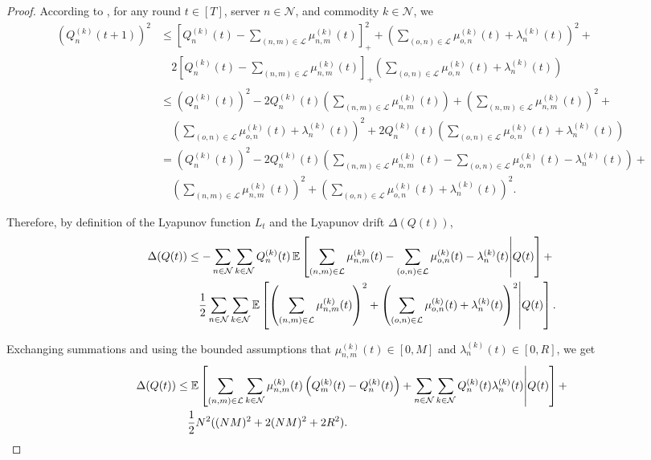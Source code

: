 \documentclass[11pt,fullpage,letterpaper]{article} %
\renewcommand{\bm}[1]{#1}%
\newcommand{\E}{\operatornamewithlimits{\mathbb{E}}}
\newcommand{\mN}{{\mathcal N}}
\newcommand{\mL}{{\mathcal L}}
\begin{document}
\begin{proof}
According to , for any round $t\in [T]$, server $n\in \mN$, and commodity $k\in \mN$, we
\begin{align*}
(Q_n^{(k)}(t+1))^2&\le \left [Q_n^{(k)}(t)-\sum_{(n,m)\in \mL}\mu_{n,m}^{(k)}(t)\right ]_+^2+\left (\sum_{(o,n)\in \mL} \mu_{o,n}^{(k)}(t) + \lambda_{n}^{(k)}(t)\right )^2+\\
&\quad 2 \left [Q_n^{(k)}(t)-\sum_{(n,m)\in \mL}\mu_{n,m}^{(k)}(t)\right ]_+\left (\sum_{(o,n)\in \mL} \mu_{o,n}^{(k)}(t) + \lambda_{n}^{(k)}(t)\right )\\
&\le (Q_n^{(k)}(t))^2 - 2 Q_n^{(k)}(t) \left (\sum_{(n,m)\in \mL}\mu_{n,m}^{(k)}(t)\right ) + \left (\sum_{(n,m)\in \mL}\mu_{n,m}^{(k)}(t)\right )^2 + \\
&\quad \left (\sum_{(o,n)\in \mL} \mu_{o,n}^{(k)}(t) + \lambda_{n}^{(k)}(t)\right )^2+2 Q_n^{(k)}(t) \left (\sum_{(o,n)\in \mL} \mu_{o,n}^{(k)}(t) + \lambda_{n}^{(k)}(t)\right )\\
&= (Q_n^{(k)}(t))^2 - 2 Q_n^{(k)}(t) \left (\sum_{(n,m)\in \mL}\mu_{n,m}^{(k)}(t) - \sum_{(o,n)\in \mL} \mu_{o,n}^{(k)}(t) - \lambda_{n}^{(k)}(t)\right ) + \\ 
&\quad \left (\sum_{(n,m)\in \mL}\mu_{n,m}^{(k)}(t)\right )^2 + \left (\sum_{(o,n)\in \mL} \mu_{o,n}^{(k)}(t) + \lambda_{n}^{(k)}(t)\right )^2.
\end{align*}

Therefore, by definition of the Lyapunov function $L_t$ and the Lyapunov drift $\Delta(\bm Q(t))$,
\begin{align*}
\Delta(\bm Q(t))&\le - \sum_{n\in \mN} \sum_{k\in \mN} Q_n^{(k)}(t) \E\left [\sum_{(n,m)\in \mL}\mu_{n,m}^{(k)}(t) - \sum_{(o,n)\in \mL} \mu_{o,n}^{(k)}(t) - \lambda_{n}^{(k)}(t)\middle \vert \bm Q(t)\right ] + \nonumber\\
&\quad \frac 12 \sum_{n\in \mN} \sum_{k\in \mN} \E\left [\left (\sum_{(n,m)\in \mL}\mu_{n,m}^{(k)}(t)\right )^2 + \left (\sum_{(o,n)\in \mL} \mu_{o,n}^{(k)}(t) + \lambda_{n}^{(k)}(t)\right )^2\middle \vert \bm Q(t)\right ].
\end{align*}

Exchanging summations and using the bounded assumptions that $\mu_{n,m}^{(k)}(t)\in [0,M]$ and $\lambda_n^{(k)}(t)\in [0,R]$, we get
\begin{align*}
\Delta(\bm Q(t))&\le \E\left [\sum_{(n,m)\in \mL} \sum_{k\in \mN} \mu_{n,m}^{(k)}(t)\left (Q_m^{(k)}(t)-Q_n^{(k)}(t)\right ) + \sum_{n\in \mN} \sum_{k\in \mN} Q_n^{(k)}(t) \lambda_n^{(k)}(t)\middle \vert \bm Q(t)\right ] + \nonumber \\
&\quad \frac 12 N^2 ((NM)^2+2(NM)^2+2R^2).
\end{align*}


\end{proof}
\end{document}
